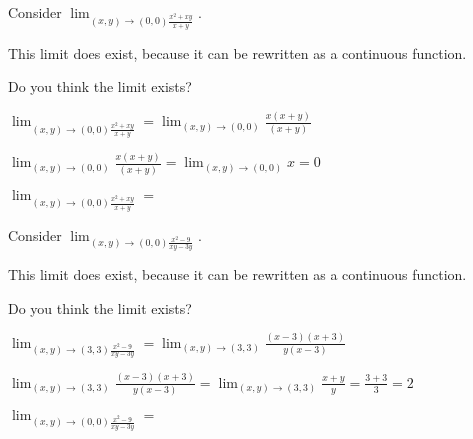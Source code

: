\documentclass{ximera}
\begin{document}
	\begin{question}
		Consider $\lim_{(x,y) \to (0,0) \frac{x^2+xy}{x+y}}$.
		\begin{solution}
			\begin{hint}
				This limit does exist, because it can be rewritten as a continuous function.
			\end{hint}
			Do you think the limit exists?
				\begin{multiple-choice}
				\end{multiple-choice}
		\end{solution}
		
		\begin{solution}
			\begin{hint}
				$\lim_{(x,y) \to (0,0) \frac{x^2+xy}{x+y}} = \lim_{(x,y) \to (0,0)} \frac{x(x+y)}{(x+y)}$
			\end{hint}
			\begin{hint}
				$\lim_{(x,y) \to (0,0)} \frac{x(x+y)}{(x+y)} = \lim_{(x,y) \to (0,0)} x = 0$
			\end{hint}
			$\lim_{(x,y) \to (0,0) \frac{x^2+xy}{x+y}} = $\answer{$0$}
		\end{solution}		
		
	\end{question}
	
	\begin{question}
		Consider $\lim_{(x,y) \to (0,0) \frac{x^2-9}{xy-3y}}$.
		\begin{solution}
			\begin{hint}
				This limit does exist, because it can be rewritten as a continuous function.
			\end{hint}
			Do you think the limit exists?
				\begin{multiple-choice}
					\choice[correct]{Yes}
					\choice{No}
				\end{multiple-choice}
		\end{solution}
		
		\begin{solution}
			\begin{hint}
				$\lim_{(x,y) \to (3,3) \frac{x^2-9}{xy-3y}} = \lim_{(x,y) \to (3,3)} \frac{(x-3)(x+3)}{y(x-3)}$
			\end{hint}
			\begin{hint}
				$\lim_{(x,y) \to (3,3)} \frac{(x-3)(x+3)}{y(x-3)} = \lim_{(x,y) \to (3,3)} \frac{x+y}{y} = \frac{3+3}{3} = 2$
			\end{hint}
			$\lim_{(x,y) \to (0,0) \frac{x^2-9}{xy-3y}} = $\answer{$2$}
		\end{solution}		
		
	\end{question}
	
\end{document}
